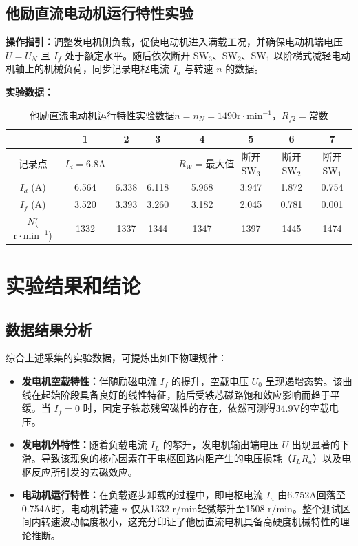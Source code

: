\begin{framed}
{			\subsection{他励直流电动机运行特性实验}
			\textbf{操作指引：}调整发电机侧负载，促使电动机进入满载工况，并确保电动机端电压 $U=U_N$ 且 $I_f$ 处于额定水平。随后依次断开 $\text{SW}_3$、$\text{SW}_2$、$\text{SW}_1$ 以阶梯式减轻电动机轴上的机械负荷，同步记录电枢电流 $I_a$ 与转速 $n$ 的数据。
			
			\textbf{实验数据：}
			\begin{table}[H]
				\centering
				\caption{\hspace{0.5em}他励直流电动机运行特性实验数据$n=n_N=1490\mathrm{r} \cdot \mathrm{min}^{-1}$，$R_{f2}=\text{常数}$}
				\begin{tabular}{cccccccc}
					\toprule
					& 1 & 2 & 3 & 4 & 5 & 6 & 7 \\
					\midrule
					记录点 & $I_d=6.8\text{A}$ & & & $R_W=\text{最大值}$ & 断开$\text{SW}_3$ & 断开$\text{SW}_2$ & 断开$\text{SW}_1$ \\
					$I_d$ (A) & 6.564 & 6.338 & 6.118 & 5.968 & 3.947 & 1.872 & 0.754 \\
					$I_f$ (A) & 3.520 & 3.393 & 3.260 & 3.182 & 2.045 & 0.781 & 0.001 \\
					$N$($\mathrm{r} \cdot \mathrm{min}^{-1}$) & 1332 & 1337 & 1344 & 1347 & 1397 & 1445 & 1474 \\
					\bottomrule
				\end{tabular}
			\end{table}
			
			\section{实验结果和结论}
			\subsection{数据结果分析}
			综合上述采集的实验数据，可提炼出如下物理规律：
			\begin{itemize}
				\item \textbf{发电机空载特性：}伴随励磁电流 $I_f$ 的提升，空载电压 $U_0$ 呈现递增态势。该曲线在起始阶段具备良好的线性特征，随后受铁芯磁路饱和效应影响而趋于平缓。当 $I_f=0$ 时，因定子铁芯残留磁性的存在，依然可测得34.9V的空载电压。
				\item \textbf{发电机外特性：}随着负载电流 $I_L$ 的攀升，发电机输出端电压 $U$ 出现显著的下滑。导致该现象的核心因素在于电枢回路内阻产生的电压损耗（$I_L R_a$）以及电枢反应所引发的去磁效应。
				\item \textbf{电动机运行特性：}在负载逐步卸载的过程中，即电枢电流 $I_a$ 由6.752A回落至0.754A时，电动机转速 $n$ 仅从1332 r/min轻微攀升至1508 r/min。整个测试区间内转速波动幅度极小，这充分印证了他励直流电机具备高硬度机械特性的理论推断。
			\end{itemize}
			
}
\end{framed}
